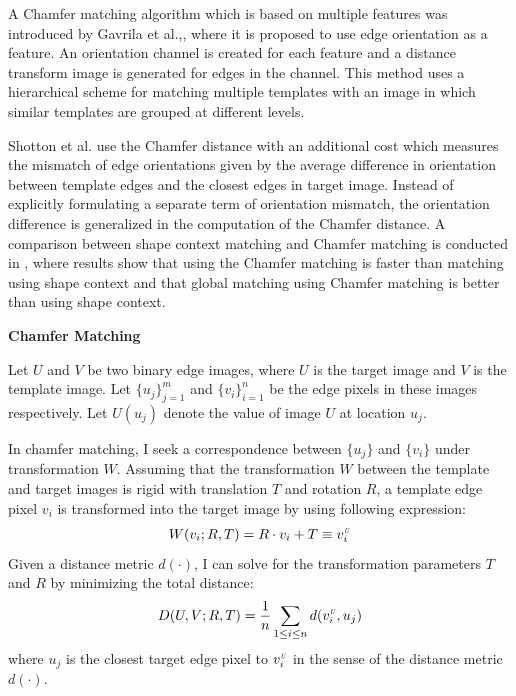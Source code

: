 \documentclass{iitthesis}
\begin{document}
A Chamfer matching algorithm which is based on multiple features was introduced by Gavrila et al.\cite{DG:98},\cite{DG:99}, where it is proposed to use edge orientation as a feature. An orientation channel is created for each feature and a distance transform image is generated for edges in the channel. This method uses a hierarchical scheme for matching multiple templates with an image in which similar templates are grouped at different levels.

Shotton et al.\cite{JS:08} use the Chamfer distance with an additional cost which measures the mismatch of edge orientations given by the average difference in orientation between template edges and the closest edges in target image. Instead of explicitly formulating a separate term of orientation mismatch, the orientation difference is generalized in the computation of the Chamfer distance\cite{ML:10}. A comparison between shape context matching and Chamfer matching is conducted in \cite{AT:03}, where results show that using the Chamfer matching is faster than matching using shape context and that global matching using Chamfer matching is better than using shape context.

\noindent \textbf{Chamfer Matching}

Let $U$ and $V$ be two binary edge images, where $U$ is the target image and $V$ is the template image. Let $\{u_j\}_{j=1}^m$ and $\{v_i\}_{i=1}^n$ be the edge pixels in these images respectively. Let $U(u_j)$ denote the value of image $U$ at location $u_j$.

In chamfer matching, I seek a correspondence between $\{u_j\}$ and $\{v_i\}$ under transformation $W$. Assuming that the transformation $W$ between the template and target images is rigid with translation $T$ and rotation $R$, a template edge pixel $v_i$ is transformed into the target image by using following expression:
\begin{equation}
W(v_i;R, T)=R \cdot v_i + T \equiv v_i^{\scalebox{.5}{\textit{U}}}
\end{equation}
Given a distance metric $d(\cdot)$, I can solve for the transformation parameters $T$ and $R$ by minimizing the total distance:
\begin{equation}
D(U, V;R, T)=\frac{1}{n}\sum_{1\leq i\leq n}d(v_i^{\scalebox{.5}{\textit{U}}}, u_j)
\label{Equ: Dist between U and V}
\end{equation}
where $u_j$ is the closest target edge pixel to $v_i^{\scalebox{.5}{\textit{U}}}$ in the sense of the distance metric $d(\cdot)$.
\end{document}
